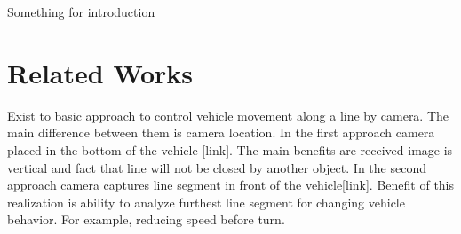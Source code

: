 \documentclass[a4paper,12pt]{article} %
\begin{document}
Something for introduction

\vspace{1cm}

\vspace{1cm}
 



\vspace{1cm}



\section*{Related Works}

Exist to basic approach to control vehicle movement along a line by camera. The main difference between them is camera location. In the first approach camera placed in the bottom of the vehicle [link]. The main benefits are received image is vertical and fact that line will not be closed by another object. In the second approach camera captures line segment in front of the vehicle[link]. Benefit of this realization is ability to analyze furthest line segment for changing vehicle behavior. For example, reducing speed before turn. 
\end{document}
